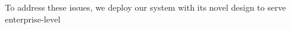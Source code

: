 % 













To address these issues, we deploy our \sys system with its novel design to serve enterprise-level  


